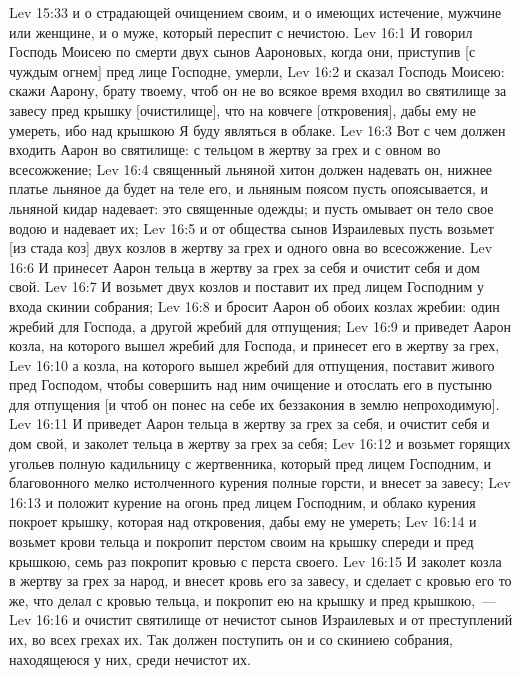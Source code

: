 \vs Lev 15:33 и о страдающей очищением своим, и о имеющих истечение, мужчине или женщине, и о муже, который переспит с нечистою.
\vs Lev 16:1 И говорил Господь Моисею по смерти двух сынов Аароновых, когда они, приступив [с чуждым огнем] пред лице Господне, умерли,
\vs Lev 16:2 и сказал Господь Моисею: скажи Аарону, брату твоему, чтоб он не во всякое время входил во святилище за завесу пред крышку [очистилище], что на ковчеге [откровения], дабы ему не умереть, ибо над крышкою Я буду являться в облаке.
\vs Lev 16:3 Вот с чем должен входить Аарон во святилище: с тельцом в жертву за грех и с овном во всесожжение;
\vs Lev 16:4 священный льняной хитон должен надевать он, нижнее платье льняное да будет на теле его, и льняным поясом пусть опоясывается, и льняной кидар надевает: это священные одежды; и пусть омывает он тело свое водою и надевает их;
\vs Lev 16:5 и от общества сынов Израилевых пусть возьмет [из стада коз] двух козлов в жертву за грех и одного овна во всесожжение.
\vs Lev 16:6 И принесет Аарон тельца в жертву за грех за себя и очистит себя и дом свой.
\vs Lev 16:7 И возьмет двух козлов и поставит их пред лицем Господним у входа скинии собрания;
\vs Lev 16:8 и бросит Аарон об обоих козлах жребии: один жребий для Господа, а другой жребий для отпущения;
\vs Lev 16:9 и приведет Аарон козла, на которого вышел жребий для Господа, и принесет его в жертву за грех,
\vs Lev 16:10 а козла, на которого вышел жребий для отпущения, поставит живого пред Господом, чтобы совершить над ним очищение и отослать его в пустыню для отпущения [и чтоб он понес на себе их беззакония в землю непроходимую].
\vs Lev 16:11 И приведет Аарон тельца в жертву за грех за себя, и очистит себя и дом свой, и заколет тельца в жертву за грех за себя;
\vs Lev 16:12 и возьмет горящих угольев полную кадильницу с жертвенника, который пред лицем Господним, и благовонного мелко истолченного курения полные горсти, и внесет за завесу;
\vs Lev 16:13 и положит курение на огонь пред лицем Господним, и облако курения покроет крышку, которая над  откровения, дабы ему не умереть;
\vs Lev 16:14 и возьмет крови тельца и покропит перстом своим на крышку спереди и пред крышкою, семь раз покропит кровью с перста своего.
\vs Lev 16:15 И заколет козла в жертву за грех за народ, и внесет кровь его за завесу, и сделает с кровью его то же, что делал с кровью тельца, и покропит ею на крышку и пред крышкою,~---
\vs Lev 16:16 и очистит святилище от нечистот сынов Израилевых и от преступлений их, во всех грехах их. Так должен поступить он и со скиниею собрания, находящеюся у них, среди нечистот их.
